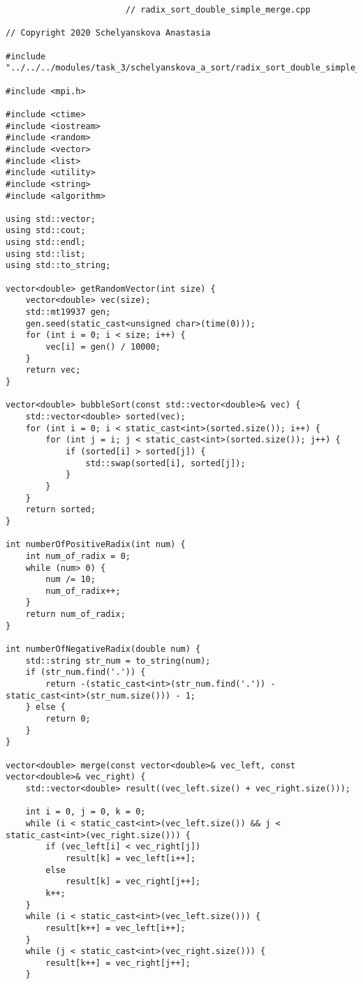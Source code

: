 \documentclass{report}
\begin{document}
\begin{lstlisting}
						// radix_sort_double_simple_merge.cpp

// Copyright 2020 Schelyanskova Anastasia

#include "../../../modules/task_3/schelyanskova_a_sort/radix_sort_double_simple_merge.h"

#include <mpi.h>

#include <ctime>
#include <iostream>
#include <random>
#include <vector>
#include <list>
#include <utility>
#include <string>
#include <algorithm>

using std::vector;
using std::cout;
using std::endl;
using std::list;
using std::to_string;

vector<double> getRandomVector(int size) {
    vector<double> vec(size);
    std::mt19937 gen;
    gen.seed(static_cast<unsigned char>(time(0)));
    for (int i = 0; i < size; i++) {
        vec[i] = gen() / 10000;
    }
    return vec;
}

vector<double> bubbleSort(const std::vector<double>& vec) {
    std::vector<double> sorted(vec);
    for (int i = 0; i < static_cast<int>(sorted.size()); i++) {
        for (int j = i; j < static_cast<int>(sorted.size()); j++) {
            if (sorted[i] > sorted[j]) {
                std::swap(sorted[i], sorted[j]);
            }
        }
    }
    return sorted;
}

int numberOfPositiveRadix(int num) {
    int num_of_radix = 0;
    while (num> 0) {
        num /= 10;
        num_of_radix++;
    }
    return num_of_radix;
}

int numberOfNegativeRadix(double num) {
    std::string str_num = to_string(num);
    if (str_num.find('.')) {
        return -(static_cast<int>(str_num.find('.')) - static_cast<int>(str_num.size())) - 1;
    } else {
        return 0;
    }
}

vector<double> merge(const vector<double>& vec_left, const vector<double>& vec_right) {
    std::vector<double> result((vec_left.size() + vec_right.size()));

    int i = 0, j = 0, k = 0;
    while (i < static_cast<int>(vec_left.size()) && j < static_cast<int>(vec_right.size())) {
        if (vec_left[i] < vec_right[j])
            result[k] = vec_left[i++];
        else
            result[k] = vec_right[j++];
        k++;
    }
    while (i < static_cast<int>(vec_left.size())) {
        result[k++] = vec_left[i++];
    }
    while (j < static_cast<int>(vec_right.size())) {
        result[k++] = vec_right[j++];
    }


\end{lstlisting}
\end{document}
